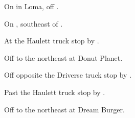 

\begin{LocationList}

On  in Loma, off  .

On , southeast of  .

At the Haulett truck stop by  .

Off   to the northeast at Donut Planet.

Off  opposite the Driverse truck stop by  .

Past the Haulett truck stop by  .

Off   to the northeast at Dream Burger.

\end{LocationList}
